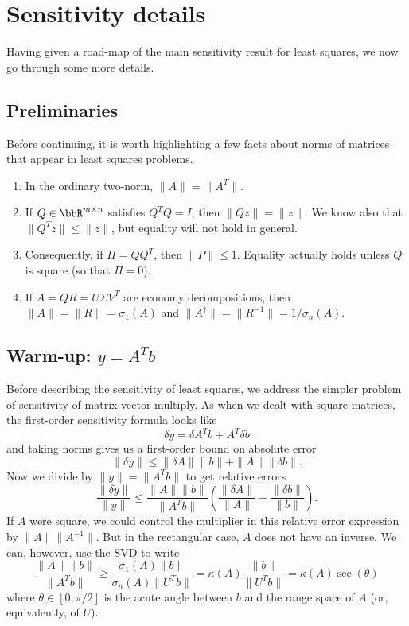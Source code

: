 \section{Sensitivity details}

Having given a road-map of the main sensitivity result for least
squares, we now go through some more details.

\subsection{Preliminaries}

Before continuing, it is worth highlighting a few facts about
norms of matrices that appear in least squares problems.
\begin{enumerate}
  \item In the ordinary two-norm, $\|A\| = \|A^T\|$.
  \item If $Q \in \bbR^{m \times n}$ satisfies $Q^T Q = I$,
  then $\|Qz\| = \|z\|$.  We know also that $\|Q^T z\| \leq \|z\|$,
  but equality will not hold in general.
  \item Consequently, if $\Pi = QQ^T$, then $\|P\| \leq 1$.  Equality
  actually holds unless $Q$ is square (so that $\Pi = 0$).
  \item If $A = QR = U \Sigma V^T$ are economy decompositions,
  then $\|A\| = \|R\| = \sigma_1(A)$ and
  $\|A^\dagger\| = \|R^{-1}\| = 1/\sigma_n(A)$.
\end{enumerate}

\subsection{Warm-up: $y = A^T b$}

Before describing the sensitivity of least squares, we address
the simpler problem of sensitivity of matrix-vector multiply.
As when we dealt with square matrices, the first-order
sensitivity formula looks like
\[
  \delta y = \delta A^T b + A^T \delta b
\]
and taking norms gives us a first-order bound on absolute error
\[
  \|\delta y\| \leq \|\delta A\| \|b\| + \|A\| \|\delta b\|.
\]
Now we divide by $\|y\| = \|A^T b\|$ to get relative errors
\[
  \frac{\|\delta y\|}{\|y\|} \leq
    \frac{\|A\| \|b\|}{\|A^T b\|} \left(
    \frac{\|\delta A\|}{\|A\|} +
    \frac{\|\delta b\|}{\|b\|} \right).
\]
If $A$ were square, we could control the multiplier in this relative
error expression by $\|A\| \|A^{-1}\|$.  But in the rectangular case,
$A$ does not have an inverse.  We can, however, use the SVD to write
\[
  \frac{\|A\| \|b\|}{\|A^T b\|} \geq
  \frac{\sigma_1(A) \|b\|}{\sigma_n(A) \|U^T b\|} =
  \kappa(A) \frac{\|b\|}{\|U^T b\|} = \kappa(A) \sec(\theta)
\]
where $\theta \in [0, \pi/2]$ is the acute angle between $b$ and the
range space of $A$ (or, equivalently, of $U$).


